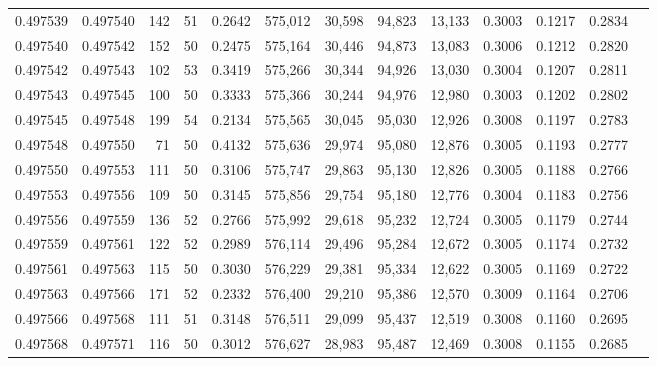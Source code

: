 \begin{tabular}{rrrrrrrrrrrrr}
0.497539 & 0.497540 &   142 &  51 &                                     0.2642 & 575,012 &  30,598 &  94,823 &  13,133 & 0.3003 & 0.1217 & 0.2834 \\
0.497540 & 0.497542 &   152 &  50 &                                     0.2475 & 575,164 &  30,446 &  94,873 &  13,083 & 0.3006 & 0.1212 & 0.2820 \\
0.497542 & 0.497543 &   102 &  53 &                                     0.3419 & 575,266 &  30,344 &  94,926 &  13,030 & 0.3004 & 0.1207 & 0.2811 \\
0.497543 & 0.497545 &   100 &  50 &                                     0.3333 & 575,366 &  30,244 &  94,976 &  12,980 & 0.3003 & 0.1202 & 0.2802 \\
0.497545 & 0.497548 &   199 &  54 &                                     0.2134 & 575,565 &  30,045 &  95,030 &  12,926 & 0.3008 & 0.1197 & 0.2783 \\
0.497548 & 0.497550 &    71 &  50 &                                     0.4132 & 575,636 &  29,974 &  95,080 &  12,876 & 0.3005 & 0.1193 & 0.2777 \\
0.497550 & 0.497553 &   111 &  50 &                                     0.3106 & 575,747 &  29,863 &  95,130 &  12,826 & 0.3005 & 0.1188 & 0.2766 \\
0.497553 & 0.497556 &   109 &  50 &                                     0.3145 & 575,856 &  29,754 &  95,180 &  12,776 & 0.3004 & 0.1183 & 0.2756 \\
0.497556 & 0.497559 &   136 &  52 &                                     0.2766 & 575,992 &  29,618 &  95,232 &  12,724 & 0.3005 & 0.1179 & 0.2744 \\
0.497559 & 0.497561 &   122 &  52 &                                     0.2989 & 576,114 &  29,496 &  95,284 &  12,672 & 0.3005 & 0.1174 & 0.2732 \\
0.497561 & 0.497563 &   115 &  50 &                                     0.3030 & 576,229 &  29,381 &  95,334 &  12,622 & 0.3005 & 0.1169 & 0.2722 \\
0.497563 & 0.497566 &   171 &  52 &                                     0.2332 & 576,400 &  29,210 &  95,386 &  12,570 & 0.3009 & 0.1164 & 0.2706 \\
0.497566 & 0.497568 &   111 &  51 &                                     0.3148 & 576,511 &  29,099 &  95,437 &  12,519 & 0.3008 & 0.1160 & 0.2695 \\
0.497568 & 0.497571 &   116 &  50 &                                     0.3012 & 576,627 &  28,983 &  95,487 &  12,469 & 0.3008 & 0.1155 & 0.2685 \\

\end{tabular}
